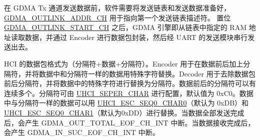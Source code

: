 \documentclass[main\_\_CN.tex]{subfiles}
\begin{document}
在 GDMA Tx 通道发送数据前，软件需要将发送链表和发送数据准备好，\hyperref[fielddesc:GDMAOUTLINKADDRCHN]{GDMA\_OUTLINK\_ADDR\_CH} 用于指向第一个发送链表描述符。 置位 \hyperref[fielddesc:GDMAOUTLINKSTARTCHN]{GDMA\_OUTLINK\_START\_CH} 之后，GDMA 引擎即从链表中指定的 RAM 地址读取数据，并通过 Encoder 进行数据包封装，然后经 UART 的发送模块串行发送出去。

HCI 的数据包格式为（分隔符+数据+分隔符）。Encoder 用于在数据前后加上分隔符，并将数据中和分隔符一样的数据用特殊字符替换。Decoder 用于去除数据包前后分隔符，并将数据中的特殊字符进行替换为分隔符。数据前后的分隔符可以有连续多个。分隔符可由 \hyperref[fielddesc:UHCISEPERCHAR]{UHCI\_SEPER\_CHAR} 进行配置，默认值为 0xC0。数据中与分隔符一样的数据可以用 \hyperref[fielddesc:UHCIESCSEQ0CHAR0]{UHCI\_ESC\_SEQ0\_CHAR0}（默认为 0xDB）和 \hyperref[fielddesc:UHCIESCSEQ0CHAR1]{UHCI\_ESC\_SEQ0\_CHAR1}（默认为0xDD）进行替换。当数据全部发送完成后，会产生 GDMA\_OUT\_TOTAL\_EOF\_CH\_INT 中断。当数据接收完成后，会产生 GDMA\_IN\_SUC\_EOF\_CH\_INT 中断。
\end{document}
